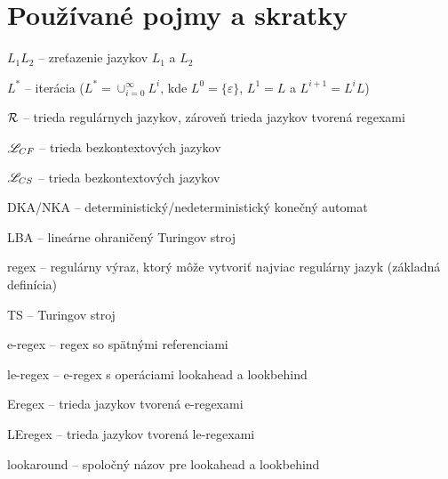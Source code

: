 \chapter*{Používané pojmy a skratky}
\label{chap:pojmy}

\begin{list}{}{}
\item $ L_{1}L_{2} $ -- zreťazenie jazykov $ L_{1} $ a $ L_{2} $
\item $ L^* $ -- iterácia ($L^*=\cup^{\infty}_{i=0}L^i$, kde $L^0=\lbrace \varepsilon \rbrace$, $L^1=L$ a $L^{i+1}=L^iL$)
\item $ {\cal R} $ -- trieda regulárnych jazykov, zároveň trieda jazykov tvorená regexami
\item $ \mathscr{L}_{CF}$ -- trieda bezkontextových jazykov
\item $ \mathscr{L}_{CS}$ -- trieda bezkontextových jazykov
\item DKA/NKA -- deterministický/nedeterministický konečný automat
\item LBA -- lineárne ohraničený Turingov stroj
\item regex -- regulárny výraz, ktorý môže vytvoriť najviac regulárny jazyk (základná definícia)
\item TS -- Turingov stroj
\item e-regex -- regex so spätnými referenciami
\item le-regex -- e-regex s operáciami lookahead a lookbehind
\item Eregex -- trieda jazykov tvorená e-regexami
\item LEregex -- trieda jazykov tvorená le-regexami
\item lookaround -- spoločný názov pre lookahead a lookbehind
\end{list}

